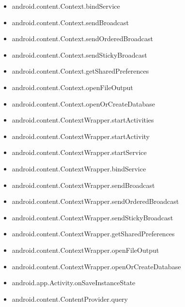 \documentclass{sig-alternate}
\begin{document}
\begin{itemize}
\item android.content.Context.bindService
\item android.content.Context.sendBroadcast
\item android.content.Context.sendOrderedBroadcast
\item android.content.Context.sendStickyBroadcast
\item android.content.Context.getSharedPreferences
\item android.content.Context.openFileOutput
\item android.content.Context.openOrCreateDatabase
\item android.content.ContextWrapper.startActivities
\item android.content.ContextWrapper.startActivity
\item android.content.ContextWrapper.startService
\item android.content.ContextWrapper.bindService
\item android.content.ContextWrapper.sendBroadcast
\item android.content.ContextWrapper.sendOrderedBroadcast
\item android.content.ContextWrapper.sendStickyBroadcast
\item android.content.ContextWrapper.getSharedPreferences
\item android.content.ContextWrapper.openFileOutput
\item android.content.ContextWrapper.openOrCreateDatabase
\item android.app.Activity.onSaveInstanceState
\item android.content.ContentProvider.query

\end{itemize}
\end{document}
